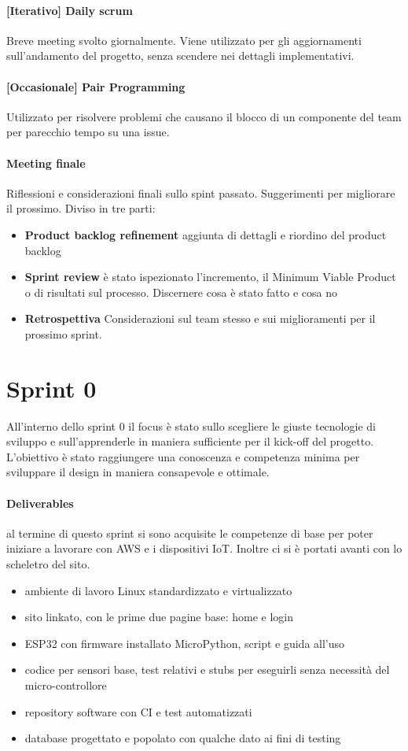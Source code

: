     \paragraph{[Iterativo] Daily scrum} Breve meeting svolto giornalmente. Viene utilizzato per gli aggiornamenti sull'andamento del progetto, senza scendere nei dettagli implementativi.
    \paragraph{[Occasionale] Pair Programming } Utilizzato per risolvere problemi che causano il blocco di un componente del team per parecchio tempo su una issue.
    \paragraph{Meeting finale}
        Riflessioni e considerazioni finali sullo spint passato. Suggerimenti per migliorare il prossimo. Diviso in tre parti: 
        \begin{itemize}
        \item\textbf{Product backlog refinement} aggiunta di dettagli e riordino del product backlog
        \item\textbf{Sprint review} è stato ispezionato l'incremento, il Minimum Viable Product o di risultati sul processo. Discernere cosa è stato fatto e cosa no
        \item\textbf{Retrospettiva} Considerazioni sul team stesso e sui miglioramenti per il prossimo sprint. 
        \end{itemize}
        
        

\section{Sprint 0}
All'interno dello sprint 0 il focus è stato sullo scegliere le giuste tecnologie di sviluppo e sull'apprenderle in maniera sufficiente per il kick-off del progetto.
L'obiettivo è stato raggiungere una conoscenza e competenza minima per sviluppare il design in maniera consapevole e ottimale.
\paragraph{Deliverables} 
al termine di questo sprint si sono acquisite le competenze di base per poter iniziare a lavorare con AWS e i dispositivi IoT. Inoltre ci si è portati avanti con lo scheletro del sito.
\begin{itemize}
    \item ambiente di lavoro Linux standardizzato e virtualizzato
    \item sito linkato, con le prime due pagine base: home e login
    \item ESP32 con firmware installato MicroPython, script e guida all'uso
    \item codice per sensori base, test relativi e stubs per eseguirli senza necessità del micro-controllore
    \item repository software con CI e test automatizzati 
    \item database progettato e popolato con qualche dato ai fini di testing
\end{itemize}

